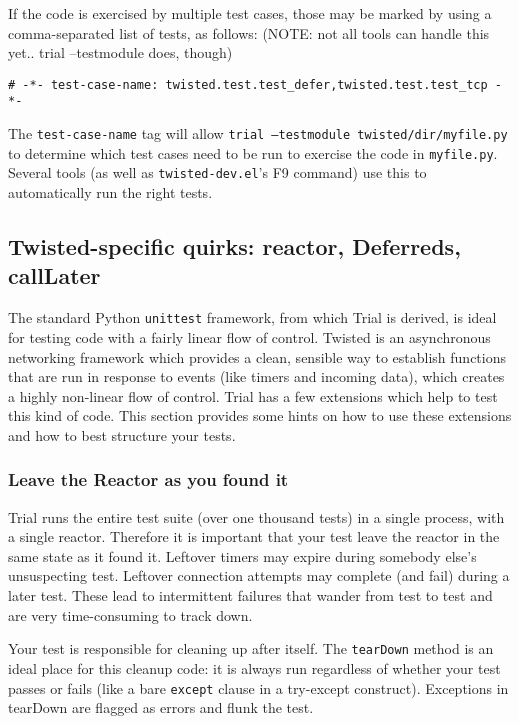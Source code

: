 If the code is exercised by multiple test cases, those may be marked by using a comma-separated list of tests, as follows: (NOTE: not all tools can handle this yet.. trial --testmodule does, though)\begin{verbatim}
# -*- test-case-name: twisted.test.test_defer,twisted.test.test_tcp -*-
\end{verbatim}


The \texttt{test-case-name} tag will allow \texttt{trial --testmodule twisted/dir/myfile.\linebreak[1]py} to determine which test cases need to be run to exercise the code in \texttt{myfile.\linebreak[1]py}. Several tools (as well as \texttt{twisted-dev.\linebreak[1]el}'s F9 command) use this to automatically run the right tests.

\subsection{Twisted-specific quirks: reactor, Deferreds, callLater}


The standard Python \texttt{unittest} framework, from which Trial is derived, is ideal for testing code with a fairly linear flow of control. Twisted is an asynchronous networking framework which provides a clean, sensible way to establish functions that are run in response to events (like timers and incoming data), which creates a highly non-linear flow of control. Trial has a few extensions which help to test this kind of code. This section provides some hints on how to use these extensions and how to best structure your tests.

\subsubsection{Leave the Reactor as you found it}


Trial runs the entire test suite (over one thousand tests) in a single process, with a single reactor. Therefore it is important that your test leave the reactor in the same state as it found it. Leftover timers may expire during somebody else's unsuspecting test. Leftover connection attempts may complete (and fail) during a later test. These lead to intermittent failures that wander from test to test and are very time-consuming to track down.

Your test is responsible for cleaning up after itself. The \texttt{tear\linebreak[1]Down} method is an ideal place for this cleanup code: it is always run regardless of whether your test passes or fails (like a bare \texttt{except} clause in a try-except construct). Exceptions in tearDown are flagged as errors and flunk the test.


